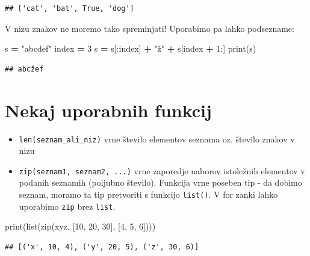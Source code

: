 \documentclass[
]{book}
\newenvironment{Shaded}{\begin{snugshade}}{\end{snugshade}}
\newcommand{\BuiltInTok}[1]{#1}
\newcommand{\DecValTok}[1]{\textcolor[rgb]{0.00,0.00,0.81}{#1}}
\newcommand{\NormalTok}[1]{#1}
\newcommand{\OperatorTok}[1]{\textcolor[rgb]{0.81,0.36,0.00}{\textbf{#1}}}
\newcommand{\StringTok}[1]{\textcolor[rgb]{0.31,0.60,0.02}{#1}}
\begin{document}
\begin{verbatim}
## ['cat', 'bat', True, 'dog']
\end{verbatim}

V nizu znakov ne moremo tako spreminjati! Uporabimo pa lahko podsezname:

\begin{Shaded}
\begin{Highlighting}[]
\NormalTok{s }\OperatorTok{=} \StringTok{"abcdef"}
\NormalTok{index }\OperatorTok{=} \DecValTok{3}
\NormalTok{s }\OperatorTok{=}\NormalTok{ s[:index] }\OperatorTok{+} \StringTok{"ž"} \OperatorTok{+}\NormalTok{ s[index }\OperatorTok{+} \DecValTok{1}\NormalTok{:]}
\BuiltInTok{print}\NormalTok{(s)}
\end{Highlighting}
\end{Shaded}

\begin{verbatim}
## abcžef
\end{verbatim}

\hypertarget{nekaj-uporabnih-funkcij}{%
\section{Nekaj uporabnih funkcij}\label{nekaj-uporabnih-funkcij}}

\begin{itemize}
\item
  \texttt{len(seznam\_ali\_niz)} vrne število elementov seznama oz. število znakov v nizu
\item
  \texttt{zip(seznam1,\ seznam2,\ ...)} vrne zaporedje naborov istoležnih elementov v podanih seznamih (poljubno število). Funkcija
  vrne poseben tip - da dobimo seznam, moramo ta tip pretvoriti s funkcijo \texttt{list()}.
  V for zanki lahko uporabimo \texttt{zip} brez \texttt{list}.
\end{itemize}

\begin{Shaded}
\begin{Highlighting}[]
\BuiltInTok{print}\NormalTok{(}\BuiltInTok{list}\NormalTok{(}\BuiltInTok{zip}\NormalTok{(}\StringTok{\textquotesingle{}xyz\textquotesingle{}}\NormalTok{, [}\DecValTok{10}\NormalTok{, }\DecValTok{20}\NormalTok{, }\DecValTok{30}\NormalTok{], [}\DecValTok{4}\NormalTok{, }\DecValTok{5}\NormalTok{, }\DecValTok{6}\NormalTok{])))}
\end{Highlighting}
\end{Shaded}

\begin{verbatim}
## [('x', 10, 4), ('y', 20, 5), ('z', 30, 6)]
\end{verbatim}
\end{document}
